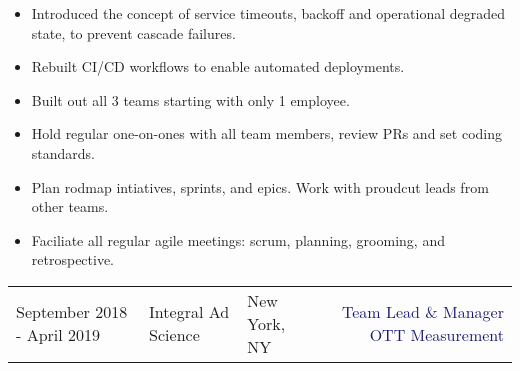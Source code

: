 \documentclass[12t]{article}
\begin{document}
\begin{multicols}{2}
\begin{small}
\begin{itemize}[leftmargin=*,label=\tiny{$\bullet$}]
    \item\begin{minipage}[t]{\linewidth}{Introduced the concept of service timeouts, backoff and operational degraded state, to prevent cascade failures.}\end{minipage}
    \item\begin{minipage}[t]{\linewidth}{Rebuilt CI/CD workflows to enable automated deployments.}\end{minipage}
    \item\begin{minipage}[t]{\linewidth}{Built out all 3 teams starting with only 1 employee.}\end{minipage}
    \item\begin{minipage}[t]{\linewidth}{Hold regular one-on-ones with all team members, review PRs and set coding standards.}\end{minipage}
    \item\begin{minipage}[t]{\linewidth}{Plan rodmap intiatives, sprints, and epics. Work with proudcut leads from other teams.}\end{minipage}
    \item\begin{minipage}[t]{\linewidth}{Faciliate all regular agile meetings: scrum, planning, grooming, and retrospective.}\end{minipage}
    \end{itemize}
  \end{small} 
\end{multicols}

\vspace{15pt}\begin{tabularx}{\textwidth}{@{}lllXr}
  September 2018 - April 2019&\textcolor{Mahogany}{Integral Ad Science}&\textcolor{Black!80}{New York, NY}&&
  \begin{minipage}[t]{1.9in}{\textcolor{MidnightBlue}{Team Lead \& Manager OTT Measurement}}\end{minipage}
\end{tabularx}
\end{document}
